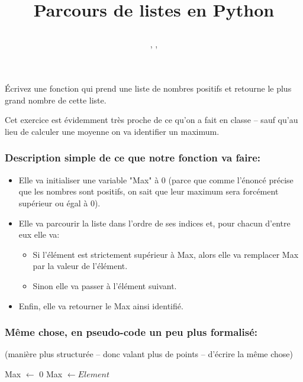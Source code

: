 \documentclass[12pt]{article}
\title
	{\vspace{3cm}
		{\Large
		\textit
			{
				\classe\hspace{0.1cm}
				\textemdash\
				\hspace{0.1cm}
				\themecours
			}
			
		\vspace{1cm}
		\huge{Parcours de listes en Python} }
		 
		\vspace{1cm}
	}
\author{\etablissement}
\date{
	\auteur,
	\datedoc,
	\footnotesize{\textit{\versiondoc}} 
	\vspace{6cm}
	}
\begin{document}
	
	\maketitle
	\thispagestyle{empty}
				
	\pagebreak	
	
	\begin{MonExo}
		Écrivez une fonction qui prend une liste de nombres positifs et retourne le plus grand nombre de cette liste.
	\end{MonExo}
	
	\begin{MaReponse}
		Cet exercice est évidemment très proche de ce qu'on a fait en classe -- sauf qu'au lieu de calculer une moyenne on va identifier un maximum.
		
		\subsubsection*{Description simple de ce que notre fonction va faire:}
		
		\begin{itemize}
			\item  Elle va initialiser une variable "Max" à 0 (parce que comme l'énoncé précise que les nombres sont positifs, on sait que leur maximum sera forcément supérieur ou égal à 0).
			\item Elle va parcourir la liste dans l'ordre de ses indices et, pour chacun d'entre eux elle va:
			\begin{itemize}
				\item Si l'élément est strictement supérieur à Max, alors elle va remplacer Max par la valeur de l'élément.
				\item Sinon elle va passer à l'élément suivant.
			\end{itemize}
			\item Enfin, elle va retourner le Max ainsi identifié.
		
		\end{itemize}
		
		\subsubsection*{Même chose, en pseudo-code un peu plus formalisé:}
		 
		 (manière plus structurée -- donc valant plus de points -- d'écrire la même chose)

		\begin{algorithmic}[1]
			\State Max $\leftarrow$ 0
			\State Max $\leftarrow Element$
			\EndIf
			\EndFor
			\State{}
			\EndFunction
		\end{algorithmic}
		

\end{MaReponse}
\end{document}
